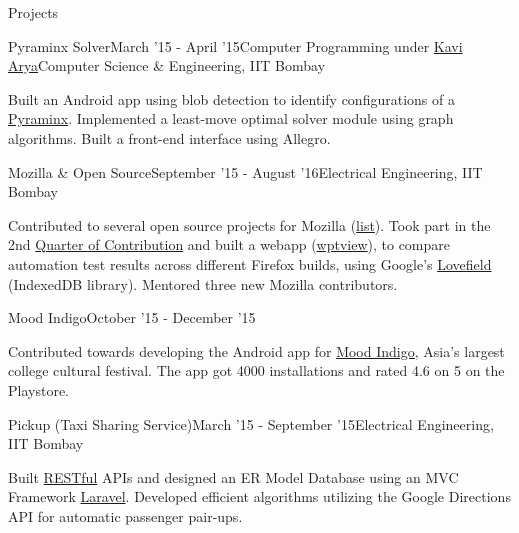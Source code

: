 \documentclass{resume} %
\begin{document}
\begin{rSection}{Projects}
\begin{rSubsection}{Pyraminx Solver}{March '15 - April '15}{Computer Programming under \href{https://www.cse.iitb.ac.in/~kavi/}{Kavi Arya}}{Computer Science \& Engineering, IIT Bombay}
\item Built an Android app using blob detection to identify configurations of a \href{https://en.wikipedia.org/wiki/Pyraminx}{Pyraminx}. Implemented a least-move optimal solver module using graph algorithms. Built a front-end interface using Allegro.
\end{rSubsection}
\vspace*{4mm}
\begin{rSubsection}{Mozilla \& Open Source}{September '15 - August '16}{}{Electrical Engineering, IIT Bombay}
\item Contributed to several open source projects for Mozilla (\href{http://martiansideofthemoon.github.io/projects/}{list}). Took part in the 2nd \href{https://wiki.mozilla.org/Auto-tools/New_Contributor/Quarter_of_Contribution/November_2015}{Quarter of Contribution} and built a webapp (\href{https://github.com/mozilla/wptview}{wptview}), to compare automation test results across different Firefox builds, using Google's \href{https://github.com/google/lovefield}{Lovefield} (IndexedDB library). Mentored three new Mozilla contributors.
\end{rSubsection}
\begin{rSubsection}{Mood Indigo}{October '15 - December '15}{}{}
\item Contributed towards developing the Android app for \href{https://moodi.org/}{Mood Indigo}, Asia’s largest college cultural festival. The app got 4000 installations and rated 4.6 on 5 on the Playstore.
\end{rSubsection}
\begin{rSubsection}{Pickup (Taxi Sharing Service)}{March '15 - September '15}{}{Electrical Engineering, IIT Bombay}
\item Built \href{https://en.wikipedia.org/wiki/Representational_state_transfer}{RESTful} APIs and designed an ER Model Database using an MVC Framework \href{https://laravel.com/}{Laravel}. Developed efficient algorithms utilizing the Google Directions API for automatic passenger pair-ups.
\end{rSubsection}
\end{rSection}
\vspace*{-1mm}
\end{document}
